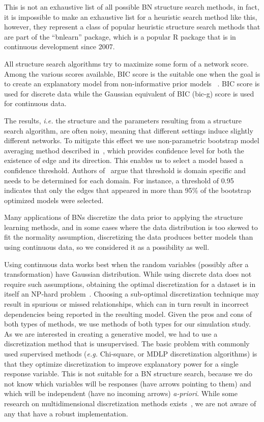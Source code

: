 \documentclass[smallcondensed]{svjour3}     %
\begin{document}
This is not an exhaustive list of all possible BN structure search methods, in fact,
it is impossible to make an exhaustive list for a heuristic search method like this, however, 
they represent a class of popular heuristic structure search methods that are part of the
``bnlearn'' package, which is a popular R package that is in continuous development since 2007.

All structure search algorithms try to maximize some form of a network score. 
Among the various scores available, BIC score is the suitable one when 
the goal is to create an explanatory model from non-informative prior models
~\cite{shmueli2010explain,sober2002instrumentalism}.
BIC score is used for discrete data while the Gaussian 
equivalent of BIC (bic-g) score is used for continuous data.

The results, \emph{i.e.} the structure and the parameters resulting from a structure
search algorithm, are often noisy, meaning that
different settings induce slightly different networks. To mitigate
this effect we use non-parametric bootstrap model averaging method
described in~\cite{friedman1999data}, which provides confidence
level for both the existence of edge and its direction. This enables
us to select a model based a confidence threshold. Authors
of~\cite{friedman1999data} argue that threshold is domain specific
and needs to be determined for each domain. For instance, a threshold of 
 0.95 indicates that  only the edges that appeared in more than
 95\% of the bootstrap optimized models were selected. 
 
Many applications of BNs discretize the data prior to applying
the structure learning methods, and in some cases where the data distribution is too skewed to fit the normality assumption, discretizing the data produces better models than using continuous data, so we considered it as a possibility as well.

Using continuous data works best
when the random variables (possibly after a transformation) 
have Gaussian distribution. While using
discrete data does not require such assumptions, obtaining the optimal
discretization for a dataset is in itself an NP-hard
problem~\cite{chlebus1998finding}. Choosing a
sub-optimal discretization technique may result in spurious or
missed relationships, which can in turn result in incorrect
dependencies being reported in the resulting model. Given the pros
and cons of both types of methods, we use methods of both types for
our simulation study. As we are interested in creating a generative model, we had to
use a discretization method that is unsupervised. The basic problem
with commonly used supervised methods (\textit{e.g.} Chi-square, or
MDLP discretization algorithms) is that they optimize
discretization to improve explanatory power for 
a single response variable. This is not suitable for a 
BN structure search, because we do
not know  which variables will be responses (have arrows
pointing to them) and which will be independent (have no incoming
arrows) {\em a-priori}. While some research on multidimensional
discretization methods exists~\cite{perez2006supervised},
we are not aware of any that have a robust implementation.
\end{document}
